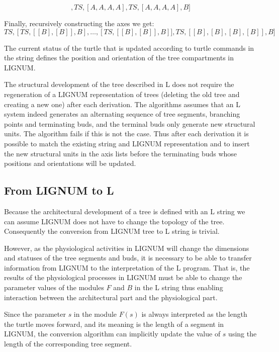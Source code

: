 \begin{equation}
[TS, [], TS, [A,A,A,A], TS, [A,A,A,A], B]
\end{equation}

Finally, recursively constructing the axes we get:
\begin{equation}
[TS, [] TS,[TS,[[B],[B]],B],\ldots, [TS,[[B],[B]],B]], TS, [[B],[B],[B],[B]], B]
\end{equation}

The current status  of the turtle that is  updated according to turtle
commands in  the string  defines the position  and orientation  of the
tree compartments in LIGNUM.

The structural development of the tree described in L does not require
the regeneration of a LIGNUM representation of trees (deleting the old
tree and  creating a new  one) after each derivation.   The algorithms
assumes that an  L system indeed generates an  alternating sequence of
tree segments, branching points and terminating buds, and the terminal
buds only generate new structural  units.  The algorithm fails if this
is not the  case.  Thus after each derivation it  is possible to match
the existing  string and LIGNUM  representation and to insert  the new
structural units in  the axis lists before the  terminating buds whose
positions and orientations will be updated.


\subsection{From LIGNUM to L}\label{sec:LignumToL}

Because the architectural  development of a tree is  defined with an L
string we  can assume LIGNUM does  not have to change  the topology of
the tree.  Consequently the conversion from LIGNUM tree to L string is
trivial.
  
However,    as     the    physiological    activities     in    LIGNUM
\citep{perttunen:96} will  change the  dimensions and statuses  of the
tree  segments  and buds,  it  is necessary  to  be  able to  transfer
information from LIGNUM to the  interpretation of the L program.  That
is, the results of the  physiological processes in LIGNUM must be able
to change  the parameter values  of the modules  $F$ and $B$ in  the L
string thus  enabling interaction  between the architectural  part and
the physiological part.

Since the parameter $s$ in  the module $F(s)$ is always interpreted as
the length the turtle moves forward,  and its meaning is the length of
a segment  in LIGNUM, the  conversion algorithm can  implicitly update
the value of $s$ using the length of the corresponding tree segment.

